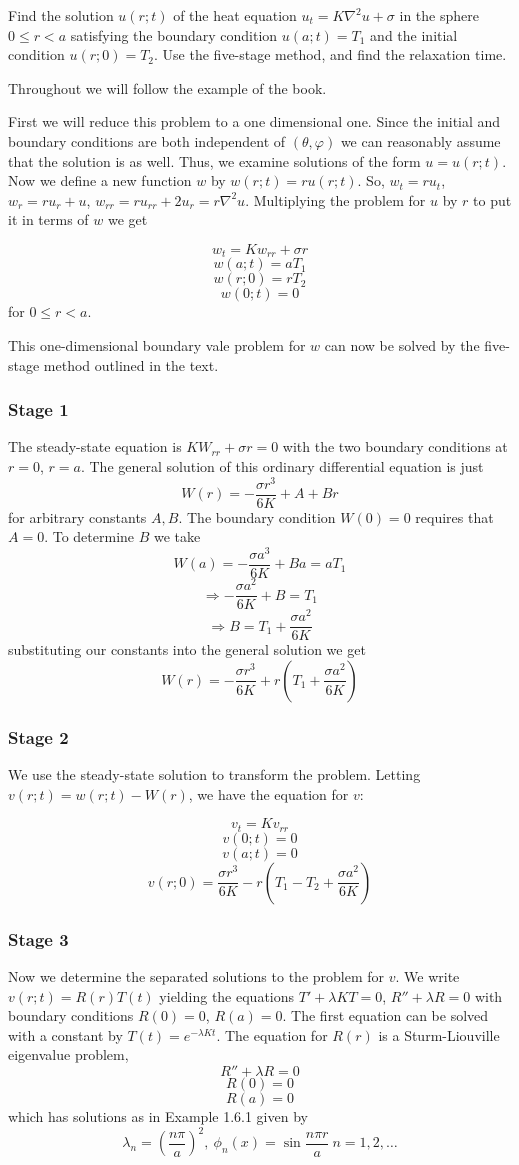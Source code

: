 \documentclass[12pt]{article}
\begin{document}
Find the solution $u(r;t)$ of the heat equation $u_t = K \nabla^2u+\sigma$ in the sphere $0 \leq r <a$ satisfying the boundary condition $u(a;t)=T_1$ and the initial condition $u(r;0)=T_2$. Use the five-stage method, and find the relaxation time.

Throughout we will follow the example of the book\cite[Page 242]{pinsky}.

First we will reduce this problem to a one dimensional one. Since the initial and boundary conditions are both independent of $(\theta, \varphi)$ we can reasonably assume that the solution is as well. Thus, we examine solutions of the form $u=u(r;t)$. Now we define a new function $w$ by $w(r;t)=ru(r;t)$. So, $w_t=ru_t$, $w_r=ru_r+u$, $w_{rr}=ru_{rr}+2u_r=r\nabla^2u$. Multiplying the problem for $u$ by $r$ to put it in terms of $w$ we get

\[ w_t=Kw_{rr}+\sigma r\]
\[ w(a;t)=aT_1\]
\[w(r;0)=rT_2\]
\[w(0;t)=0\]
for $0 \leq r <a$.

This one-dimensional boundary vale problem for $w$ can now be solved by the five-stage method outlined in the text\cite[Page 242]{pinsky}.

\subsubsection{Stage 1}

The steady-state equation is $KW_{rr}+\sigma r=0$ with the two boundary conditions at $r=0$, $r=a$. The general solution of this ordinary differential equation is just
\[W(r)=-\frac{\sigma r^3}{6K}+A+Br\]
for arbitrary constants $A, B$. The boundary condition $W(0)=0$ requires that $A=0$. To determine $B$ we take
\[W(a)=-\frac{\sigma a^3}{6K}+B a = a T_1\]
\[\Rightarrow -\frac{\sigma a^2}{6K}+B  =  T_1\]
\[\Rightarrow B  =  T_1+\frac{\sigma a^2}{6K}\]
substituting our constants into the general solution we get
\[W(r)=-\frac{\sigma r^3}{6K}+r\left(T_1+\frac{\sigma a^2}{6K}\right)\]


\subsubsection{Stage 2}

We use the steady-state solution to transform the problem. Letting $v(r;t)=w(r;t)-W(r)$, we have the equation for $v$:

\[v_t=Kv_{rr}\]
\[v(0;t)=0\]
\[v(a;t)=0\]
\[v(r;0)=\frac{\sigma r^3}{6K}-r\left(T_1-T_2+\frac{\sigma a^2}{6K}\right)\]

\subsubsection{Stage 3}
Now we determine the separated solutions to the problem for $v$. We write $v(r;t)=R(r)T(t)$ yielding the equations $T'+\lambda K T = 0$, $R''+\lambda R=0$ with boundary conditions $R(0)=0$, $R(a)=0$. The first equation can be solved with a constant by $T(t)=e^{-\lambda K t}$. The equation for $R(r)$ is a Sturm-Liouville eigenvalue problem,
\[R''+\lambda R=0 \]
\[R(0)=0\]
\[R(a)=0\]
which has solutions as in Example 1.6.1\cite[Page 85]{pinsky} given by 
\[\lambda_n=\left(\frac{n\pi}{a}\right)^2,\ \phi_n(x)=\sin{\frac{n\pi r}{a}}\ n=1,2,\dots\]
\end{document}
